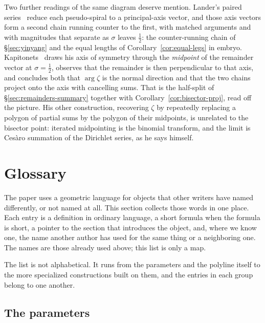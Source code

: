 \documentclass[11pt]{article}
\theoremstyle{definition}
\begin{document}
Two further readings of the same diagram deserve mention. Lander's paired
series~\cite{Lander2017,Lander2018} reduce each pseudo-spiral to a principal-axis
vector, and those axis vectors form a second chain running counter to the first,
with matched arguments and with magnitudes that separate as $\sigma$ leaves
$\tfrac12$: the counter-running chain of \S\ref{sec:yinyang} and the equal
lengths of Corollary~\ref{cor:equal-legs} in embryo.
Kapitonets~\cite{Kapitonets2019} draws his axis of symmetry through the
\emph{midpoint} of the remainder vector at $\sigma=\tfrac12$, observes that the
remainder is then perpendicular to that axis, and concludes both that
$\arg\zeta$ is the normal direction and that the two chains project onto the axis
with cancelling sums. That is the half-split of
\S\ref{sec:remainders-summary} together with Corollary~\ref{cor:bisector-proj},
read off the picture. His other construction,
recovering $\zeta$ by repeatedly replacing a polygon of partial sums by the
polygon of their midpoints, is unrelated to the bisector point: iterated
midpointing is the binomial transform, and the limit is Ces\`aro summation of the
Dirichlet series, as he says himself.

\section{Glossary}\label{sec:glossary}

The paper uses a geometric language for objects that other writers have
named differently, or not named at all. This section collects those words
in one place. Each entry is a definition in ordinary language, a short
formula when the formula is short, a pointer to the section that
introduces the object, and, where we know one, the name another author
has used for the same thing or a neighboring one. The names are those
already used above; this list is only a map.

The list is not alphabetical. It runs from the parameters and the
polyline itself to the more specialized constructions built on them,
and the entries in each group belong to one another.

\subsection*{The parameters}
\end{document}
